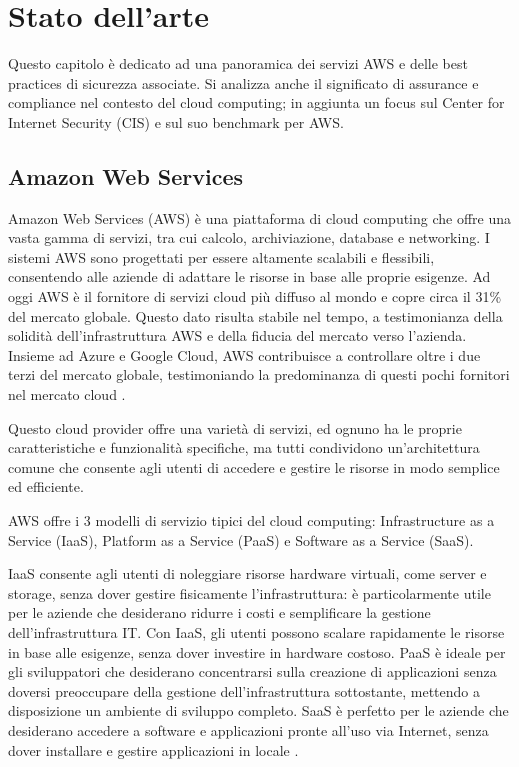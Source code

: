 \chapter{Stato dell'arte}
\label{cap:stato_arte}

Questo capitolo è dedicato ad una panoramica dei servizi AWS e delle best practices di sicurezza associate. Si analizza anche il significato di assurance e compliance nel contesto del cloud computing; in aggiunta un focus sul Center for Internet Security (CIS) e sul suo benchmark per AWS.

\section{Amazon Web Services}
\label{sec:aws}

Amazon Web Services (AWS) è una piattaforma di cloud computing che offre una vasta gamma di servizi, tra cui calcolo, archiviazione, database e networking. I sistemi AWS sono progettati per essere altamente scalabili e flessibili, consentendo alle aziende di adattare le risorse in base alle proprie esigenze. Ad oggi AWS è il fornitore di servizi cloud più diffuso al mondo e copre circa il 31\% del mercato globale. Questo dato risulta stabile nel tempo, a testimonianza della solidità dell'infrastruttura AWS e della fiducia del mercato verso l'azienda. Insieme ad Azure e Google Cloud, AWS contribuisce a controllare oltre i due terzi del mercato globale, testimoniando la predominanza di questi pochi fornitori nel mercato cloud \cite{statista2024awsmarketshare}.

Questo cloud provider offre una varietà di servizi, ed ognuno ha le proprie caratteristiche e funzionalità specifiche, ma tutti condividono un'architettura comune che consente agli utenti di accedere e gestire le risorse in modo semplice ed efficiente.

AWS offre i 3 modelli di servizio tipici del cloud computing: Infrastructure as a Service (IaaS), Platform as a Service (PaaS) e Software as a Service (SaaS).

IaaS consente agli utenti di noleggiare risorse hardware virtuali, come server e storage, senza dover gestire fisicamente l'infrastruttura: è particolarmente utile per le aziende che desiderano ridurre i costi e semplificare la gestione dell'infrastruttura IT. Con IaaS, gli utenti possono scalare rapidamente le risorse in base alle esigenze, senza dover investire in hardware costoso. PaaS è ideale per gli sviluppatori che desiderano concentrarsi sulla creazione di applicazioni senza doversi preoccupare della gestione dell'infrastruttura sottostante, mettendo a disposizione un ambiente di sviluppo completo. SaaS è perfetto per le aziende che desiderano accedere a software e applicazioni pronte all'uso via Internet, senza dover installare e gestire applicazioni in locale \cite{10823401}.

